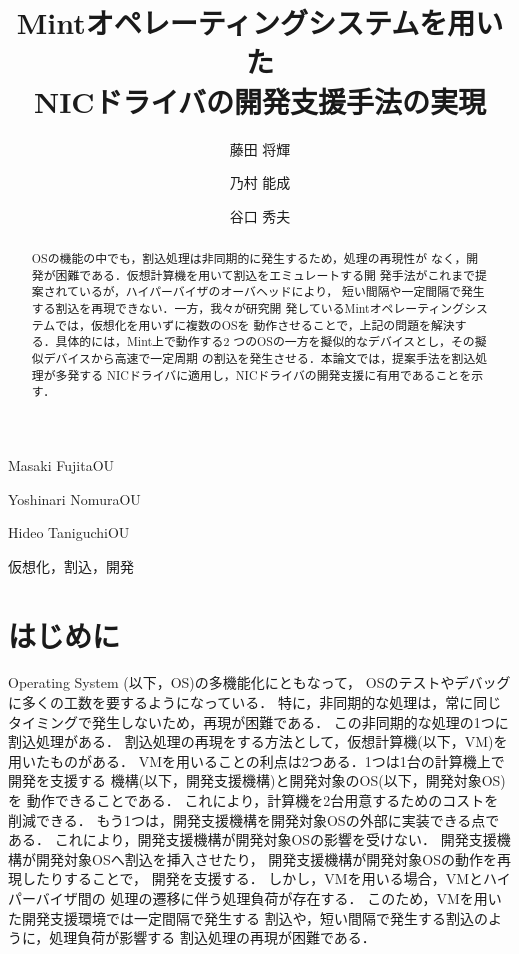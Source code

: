 \documentclass[submit,techreq,noauthor,dvipdfmx]{ipsj}
\begin{document}
\title{Mintオペレーティングシステムを用いた\\NICドライバの開発支援手法の実現}


\author{藤田 将輝}{Masaki Fujita}{OU}
\author{乃村 能成}{Yoshinari Nomura}{OU}
\author{谷口 秀夫}{Hideo Taniguchi}{OU}

\begin{abstract}
    OSの機能の中でも，割込処理は非同期的に発生するため，処理の再現性が
    なく，開発が困難である．仮想計算機を用いて割込をエミュレートする開
    発手法がこれまで提案されているが，ハイパーバイザのオーバヘッドにより，
    短い間隔や一定間隔で発生する割込を再現できない．一方，我々が研究開
    発しているMintオペレーティングシステムでは，仮想化を用いずに複数のOSを
    動作させることで，上記の問題を解決する．具体的には，Mint上で動作する2
    つのOSの一方を擬似的なデバイスとし，その擬似デバイスから高速で一定周期
    の割込を発生させる．本論文では，提案手法を割込処理が多発する
    NICドライバに適用し，NICドライバの開発支援に有用であることを示す． 
\end{abstract}

\begin{jkeyword}
    仮想化，割込，開発
\end{jkeyword}
\maketitle

\section{はじめに}

Operating System (以下，OS)の多機能化にともなって，
OSのテストやデバッグに多くの工数を要するようになっている\cite{chou2001empirical}．
特に，非同期的な処理は，常に同じタイミングで発生しないため，再現が困難である．
この非同期的な処理の1つに割込処理がある．
割込処理の再現をする方法として，仮想計算機(以下，VM)を用いたものがある．
VMを用いることの利点は2つある．1つは1台の計算機上で開発を支援する
機構(以下，開発支援機構)と開発対象のOS(以下，開発対象OS)を
動作できることである．
これにより，計算機を2台用意するためのコストを削減できる．
もう1つは，開発支援機構を開発対象OSの外部に実装できる点である．
これにより，開発支援機構が開発対象OSの影響を受けない．
開発支援機構が開発対象OSへ割込を挿入させたり，
開発支援機構が開発対象OSの動作を再現したりすることで，
開発を支援する．
しかし，VMを用いる場合，VMとハイパーバイザ間の
処理の遷移に伴う処理負荷が存在する．
このため，VMを用いた開発支援環境では一定間隔で発生する
割込や，短い間隔で発生する割込のように，処理負荷が影響する
割込処理の再現が困難である．
\end{document}
